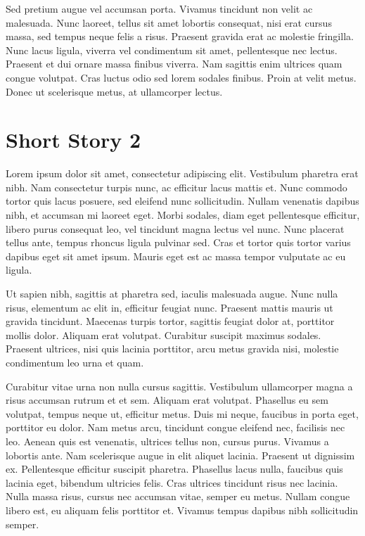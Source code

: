 \documentclass[a4paper]{memoir}
\begin{document}
Sed pretium augue vel accumsan porta. Vivamus tincidunt non velit ac malesuada. Nunc laoreet, tellus sit amet lobortis consequat, nisi erat cursus massa, sed tempus neque felis a risus. Praesent gravida erat ac molestie fringilla. Nunc lacus ligula, viverra vel condimentum sit amet, pellentesque nec lectus. Praesent et dui ornare massa finibus viverra. Nam sagittis enim ultrices quam congue volutpat. Cras luctus odio sed lorem sodales finibus. Proin at velit metus. Donec ut scelerisque metus, at ullamcorper lectus. 

\chapter{Short Story 2}
\label{shortstory2}

Lorem ipsum dolor sit amet, consectetur adipiscing elit. Vestibulum pharetra erat nibh. Nam consectetur turpis nunc, ac efficitur lacus mattis et. Nunc commodo tortor quis lacus posuere, sed eleifend nunc sollicitudin. Nullam venenatis dapibus nibh, et accumsan mi laoreet eget. Morbi sodales, diam eget pellentesque efficitur, libero purus consequat leo, vel tincidunt magna lectus vel nunc. Nunc placerat tellus ante, tempus rhoncus ligula pulvinar sed. Cras et tortor quis tortor varius dapibus eget sit amet ipsum. Mauris eget est ac massa tempor vulputate ac eu ligula. 

Ut sapien nibh, sagittis at pharetra sed, iaculis malesuada augue. Nunc nulla risus, elementum ac elit in, efficitur feugiat nunc. Praesent mattis mauris ut gravida tincidunt. Maecenas turpis tortor, sagittis feugiat dolor at, porttitor mollis dolor. Aliquam erat volutpat. Curabitur suscipit maximus sodales. Praesent ultrices, nisi quis lacinia porttitor, arcu metus gravida nisi, molestie condimentum leo urna et quam. 

Curabitur vitae urna non nulla cursus sagittis. Vestibulum ullamcorper magna a risus accumsan rutrum et et sem. Aliquam erat volutpat. Phasellus eu sem volutpat, tempus neque ut, efficitur metus. Duis mi neque, faucibus in porta eget, porttitor eu dolor. Nam metus arcu, tincidunt congue eleifend nec, facilisis nec leo. Aenean quis est venenatis, ultrices tellus non, cursus purus. Vivamus a lobortis ante. Nam scelerisque augue in elit aliquet lacinia. Praesent ut dignissim ex. Pellentesque efficitur suscipit pharetra. Phasellus lacus nulla, faucibus quis lacinia eget, bibendum ultricies felis. Cras ultrices tincidunt risus nec lacinia. Nulla massa risus, cursus nec accumsan vitae, semper eu metus. Nullam congue libero est, eu aliquam felis porttitor et. Vivamus tempus dapibus nibh sollicitudin semper. 
\end{document}
